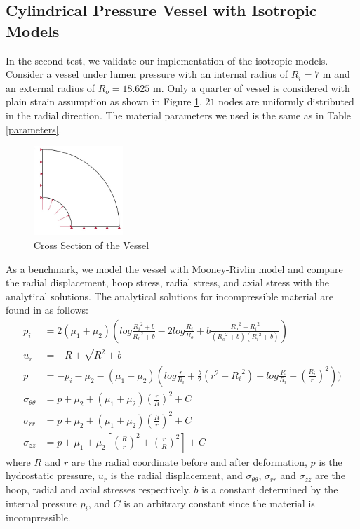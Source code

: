 \subsection{Cylindrical Pressure Vessel with Isotropic Models}
\label{pressure_vessel}
In the second test, we validate our implementation of the isotropic models. Consider a vessel under lumen pressure with an internal radius of $R_i = 7$ m and an external radius of $R_o = 18.625$ m. Only a quarter of vessel is considered with plain strain assumption as shown in Figure \ref{fig:vessel_schematic}. $21$ nodes are uniformly distributed in the radial direction. The material parameters we used is the same as in Table \ref{parameters}. 
\begin{figure}[H]
	\centering
	\includegraphics[width=0.3\textwidth]{./figures/vessel_schematic.jpg}
	\caption{Cross Section of the Vessel}
	\label{fig:vessel_schematic}
\end{figure}

As a benchmark, we model the vessel with Mooney-Rivlin model and compare the radial displacement, hoop stress, radial stress, and axial stress with the analytical solutions. The analytical solutions for incompressible material are found in \cite{Green} as follows: 
\begin{subequations}
\begin{align}
p_i &= 2(\mu_1 + \mu_2)(log\frac{{R_i}^2 + b}{{R_o}^2 + b} - 2log\frac{R_i}{R_o} +
b\frac{{R_o}^2 - {R_i}^2}{({R_o}^2+b)({R_i}^2+b)}) \\
u_r &= -R + \sqrt{R^2 + b} \\
p &= - p_i - \mu_2 - (\mu_1 + \mu_2)(log\frac{r}{R_i} + \frac{b}{2}(r^2 - {R_i}^2) - log\frac{R}{R_i} + {(\frac{R_i}{r})}^2) ) \\
\sigma_{\theta\theta} &= p + \mu_2 + (\mu_1 + \mu_2)(\frac{r}{R})^2 + C \\
\sigma_{rr} &= p + \mu_2 + (\mu_1 + \mu_2)(\frac{R}{r})^2 + C \\
\sigma_{zz} &= p +  \mu_1 + \mu_2[(\frac{R}{r})^2 + (\frac{r}{R})^2] + C
\end{align}
\end{subequations}
where $R$ and $r$ are the radial coordinate before and after deformation, $p$ is the hydrostatic pressure, $u_r$ is the radial displacement, and $\sigma_{\theta\theta}$, $\sigma_{rr}$ and $\sigma_{zz}$ are the hoop, radial and axial stresses respectively. $b$ is a constant determined by the internal pressure $p_i$, and $C$ is an arbitrary constant since the material is incompressible. 


